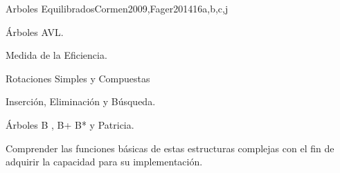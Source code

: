 \begin{syllabus}
\begin{unit}{Arboles Equilibrados}{}{Cormen2009,Fager2014}{16}{a,b,c,j}
   \begin{topics}
        \item Árboles AVL.
	\item Medida de la Eficiencia.
	\item Rotaciones Simples y Compuestas
	\item Inserción, Eliminación y Búsqueda.
	\item Árboles B , B+ B* y Patricia.
   \end{topics}

   \begin{learningoutcomes}
      \item Comprender las funciones básicas de estas estructuras complejas con el fin de adquirir la capacidad para su implementación.
   \end{learningoutcomes}
\end{unit}

\begin{coursebibliography}
\end{coursebibliography}

\end{syllabus}
